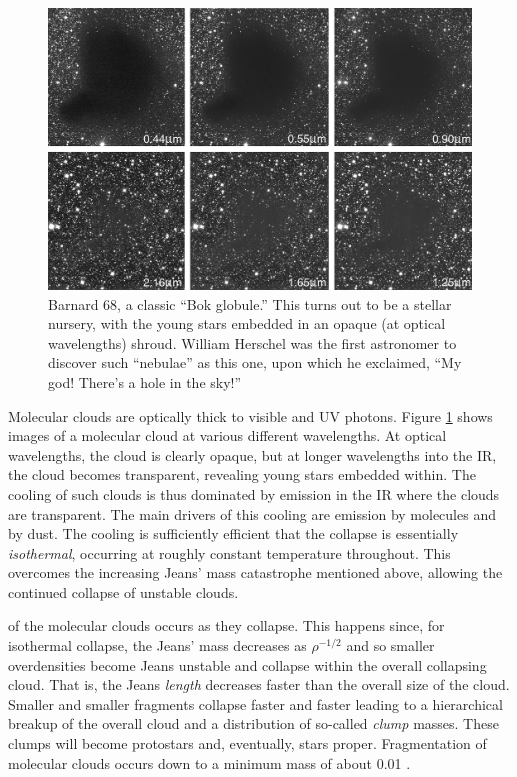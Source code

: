 \begin{figure}[htbp]
  \includegraphics[width=4.5in]{star-formation/figs/eso9934b}
  \caption{Barnard 68, a classic ``Bok globule.'' This turns out to be a stellar nursery, with the young stars embedded in an opaque (at optical wavelengths) shroud. William Herschel was the first astronomer to discover such ``nebulae'' as this one, upon which he exclaimed, ``My god! There's a hole in the sky!''}\label{f.bok}
\end{figure}

Molecular clouds are optically thick to visible and UV photons.
Figure \ref{f.bok} shows images of a molecular cloud at various different wavelengths.
At optical wavelengths, the cloud is clearly opaque, but at longer wavelengths into the IR, the cloud becomes transparent, revealing young stars embedded within.
The cooling of such clouds is thus dominated by emission in the IR where the clouds are transparent.
The main drivers of this cooling are emission by molecules and by dust.
The cooling is sufficiently efficient that the collapse is essentially {\it isothermal}, occurring at roughly constant temperature throughout.
This overcomes the increasing Jeans' mass catastrophe mentioned above, allowing the continued collapse of unstable clouds.

 of the molecular clouds occurs as they collapse.
This happens since, for isothermal collapse, the Jeans' mass decreases as $\rho^{-1/2}$ and so smaller overdensities become Jeans unstable and collapse within the overall collapsing cloud. That is, the Jeans {\it length} decreases faster than the overall size of the cloud.
Smaller and smaller fragments collapse faster and faster leading to a hierarchical breakup of the overall cloud and a distribution of so-called {\it clump} masses.
These clumps will become protostars and, eventually, stars proper.
Fragmentation of molecular clouds occurs down to a minimum mass of about 0.01 \Msun.

